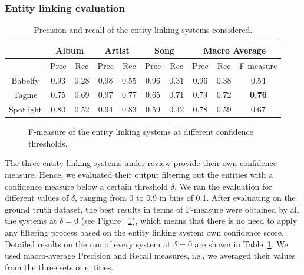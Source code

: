 \subsubsection{Entity linking evaluation}

\begin{table}[]
\scriptsize
\centering
	\begin{tabular}{ c c c c c c c c c c }
	\hline
& \multicolumn{2}{c}{Album} & \multicolumn{2}{c}{Artist} & \multicolumn{2}{c}{Song} & \multicolumn{3}{c}{Macro Average}  \\
\hline
	& Prec & Rec & Prec & Rec & Prec & Rec & Prec & Rec & F-measure \\
	\hline
Babelfy & 0.93 & 0.28 & 0.98 & 0.55 & 0.96 & 0.31 & 0.96 & 0.38 & 0.54 \\
Tagme & 0.75 & 0.69 & 0.97 & 0.77 & 0.65 & 0.71 & 0.79 & 0.72 & \textbf{0.76} \\
Spotlight & 0.80 & 0.52 & 0.94 & 0.83 & 0.59 & 0.42 & 0.78 & 0.59 & 0.67 \\
\hline
	\end{tabular}
	\caption{Precision and recall of the entity linking systems considered.}
	\label{tbl:kb:res_categories}
\end{table}

\begin{figure}[!htp]
\centerline{}
\caption[F-measure of the entity linking systems at different thresholds.]{F-measure of the entity linking systems at different confidence thresholds.}
\label{fig:kb:confidence_el}
\end{figure}

The three entity linking systems under review provide their own confidence measure. Hence, we evaluated their output filtering out the entities with a confidence measure below a certain threshold $\delta$. We ran the evaluation for different values of $\delta$, ranging from 0 to 0.9 in bins of 0.1. After evaluating on the ground truth dataset, the best results in terms of F-measure were obtained by all the systems at $\delta = 0$ (see Figure ~\ref{fig:kb:confidence_el}), which means that there is no need to apply any filtering process based on the entity linking system own confidence score. Detailed results on the run of every system at $\delta = 0$ are shown in Table~\ref{tbl:kb:res_categories}. We used macro-average Precision and Recall measures, i.e., we averaged their values from the three sets of entities.

